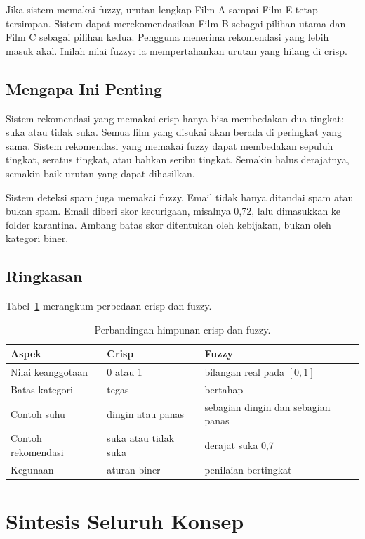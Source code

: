 \documentclass[11pt,a4paper]{article}
\begin{document}
Jika sistem memakai fuzzy, urutan lengkap Film A sampai Film E tetap tersimpan. Sistem dapat merekomendasikan Film B sebagai pilihan utama dan Film C sebagai pilihan kedua. Pengguna menerima rekomendasi yang lebih masuk akal. Inilah nilai fuzzy: ia mempertahankan urutan yang hilang di crisp.

\subsection{Mengapa Ini Penting}

Sistem rekomendasi yang memakai crisp hanya bisa membedakan dua tingkat: suka atau tidak suka. Semua film yang disukai akan berada di peringkat yang sama. Sistem rekomendasi yang memakai fuzzy dapat membedakan sepuluh tingkat, seratus tingkat, atau bahkan seribu tingkat. Semakin halus derajatnya, semakin baik urutan yang dapat dihasilkan.

Sistem deteksi spam juga memakai fuzzy. Email tidak hanya ditandai spam atau bukan spam. Email diberi skor kecurigaan, misalnya 0,72, lalu dimasukkan ke folder karantina. Ambang batas skor ditentukan oleh kebijakan, bukan oleh kategori biner.

\subsection{Ringkasan}

Tabel~\ref{tab:crisp-fuzzy} merangkum perbedaan crisp dan fuzzy.

\begin{table}[H]
	\centering
	\caption{Perbandingan himpunan crisp dan fuzzy.}
	\label{tab:crisp-fuzzy}
	\small
	\begin{tabularx}{\textwidth}{l X X}
		\toprule
		Aspek & Crisp & Fuzzy \\
		\midrule
		Nilai keanggotaan & 0 atau 1 & bilangan real pada $[0,1]$ \\
		Batas kategori & tegas & bertahap \\
		Contoh suhu & dingin atau panas & sebagian dingin dan sebagian panas \\
		Contoh rekomendasi & suka atau tidak suka & derajat suka 0,7 \\
		Kegunaan & aturan biner & penilaian bertingkat \\
		\bottomrule
	\end{tabularx}
\end{table}

\section{Sintesis Seluruh Konsep}
\end{document}
